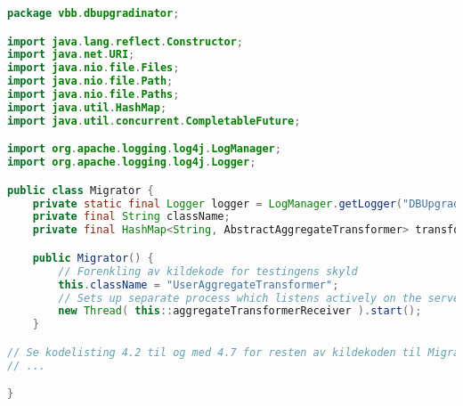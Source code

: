 \begin{lstlisting}[language=Java, caption={Migrator-klassen i DBUpgradinator}]
package vbb.dbupgradinator;

import java.lang.reflect.Constructor;
import java.net.URI;
import java.nio.file.Files;
import java.nio.file.Path;
import java.nio.file.Paths;
import java.util.HashMap;
import java.util.concurrent.CompletableFuture;

import org.apache.logging.log4j.LogManager;
import org.apache.logging.log4j.Logger;

public class Migrator {
    private static final Logger logger = LogManager.getLogger("DBUpgradinator");
    private final String className;
    private final HashMap<String, AbstractAggregateTransformer> transformers = new HashMap<>(4, (float) 0.95);

    public Migrator() {
        // Forenkling av kildekode for testingens skyld
        this.className = "UserAggregateTransformer";
        // Sets up separate process which listens actively on the server socket
        new Thread( this::aggregateTransformerReceiver ).start();
    }

// Se kodelisting 4.2 til og med 4.7 for resten av kildekoden til Migrator
// ...

}
\end{lstlisting}
